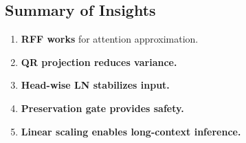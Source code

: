 \subsection{Summary of Insights}

\begin{enumerate}
\item \textbf{RFF works} for attention approximation.
\item \textbf{QR projection reduces variance.}
\item \textbf{Head-wise LN stabilizes input.}
\item \textbf{Preservation gate provides safety.}
\item \textbf{Linear scaling enables long-context inference.}

\end{enumerate}
